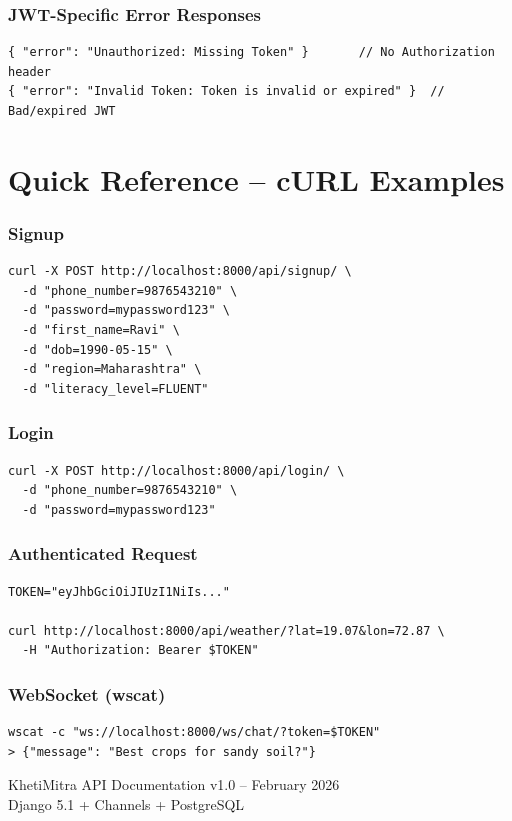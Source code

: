 \documentclass[11pt,a4paper]{article}
\begin{document}
\subsubsection*{JWT-Specific Error Responses}

\begin{lstlisting}[style=jsonStyle]
{ "error": "Unauthorized: Missing Token" }       // No Authorization header
{ "error": "Invalid Token: Token is invalid or expired" }  // Bad/expired JWT
\end{lstlisting}

\section{Quick Reference -- cURL Examples}

\subsubsection*{Signup}
\begin{lstlisting}[style=bashStyle]
curl -X POST http://localhost:8000/api/signup/ \
  -d "phone_number=9876543210" \
  -d "password=mypassword123" \
  -d "first_name=Ravi" \
  -d "dob=1990-05-15" \
  -d "region=Maharashtra" \
  -d "literacy_level=FLUENT"
\end{lstlisting}

\subsubsection*{Login}
\begin{lstlisting}[style=bashStyle]
curl -X POST http://localhost:8000/api/login/ \
  -d "phone_number=9876543210" \
  -d "password=mypassword123"
\end{lstlisting}

\subsubsection*{Authenticated Request}
\begin{lstlisting}[style=bashStyle]
TOKEN="eyJhbGciOiJIUzI1NiIs..."

curl http://localhost:8000/api/weather/?lat=19.07&lon=72.87 \
  -H "Authorization: Bearer $TOKEN"
\end{lstlisting}

\subsubsection*{WebSocket (wscat)}
\begin{lstlisting}[style=bashStyle]
wscat -c "ws://localhost:8000/ws/chat/?token=$TOKEN"
> {"message": "Best crops for sandy soil?"}
\end{lstlisting}

\vfill
\begin{center}
\small\color{black!50}
KhetiMitra API Documentation v1.0 -- February 2026 \\
Django 5.1 + Channels + PostgreSQL
\end{center}
\end{document}
